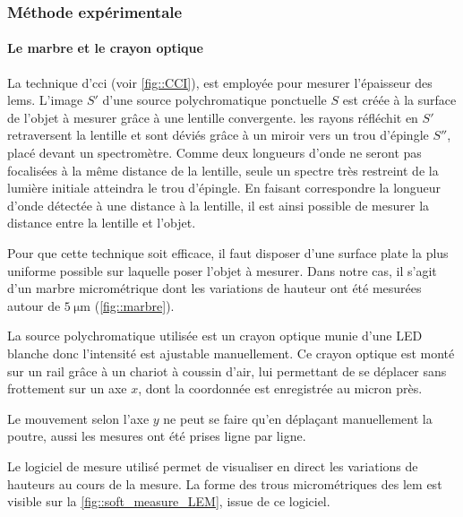             \subsubsection{Méthode expérimentale}
                \paragraph{Le marbre et le crayon optique}
                
                    La technique d'\gls{cci} (voir \autoref{fig::CCI}), est employée pour mesurer l'épaisseur des \glspl{lem}. L'image $S'$ d'une source polychromatique ponctuelle $S$ est créée à la surface de l'objet à mesurer grâce à une lentille convergente. les rayons réfléchit en $S'$ retraversent la lentille et sont déviés grâce à un miroir vers un trou d'épingle $S''$, placé devant un spectromètre. Comme deux longueurs d'onde ne seront pas focalisées à la même distance de la lentille, seule un spectre très restreint de la lumière initiale atteindra le trou d'épingle. En faisant correspondre la longueur d'onde détectée à une distance à la lentille, il est ainsi possible de mesurer la distance entre la lentille et l'objet.%
                    
                    Pour que cette technique soit efficace, il faut disposer d'une surface plate la plus uniforme possible sur laquelle poser l'objet à mesurer. Dans notre cas, il s'agit d'un marbre micrométrique dont les variations de hauteur ont été mesurées autour de $\SI{5}{\micro\meter}$ (\autoref{fig::marbre}).
                    
                    La source polychromatique utilisée est un crayon optique munie d'une LED blanche donc l'intensité est ajustable manuellement. Ce crayon optique est monté sur un rail grâce à un chariot à coussin d'air, lui permettant de se déplacer sans frottement sur un axe $x$, dont la coordonnée est enregistrée au micron près.
                    
                    Le mouvement selon l'axe $y$ ne peut se faire qu'en déplaçant manuellement la poutre, aussi les mesures ont été prises ligne par ligne.
                    
                    Le logiciel de mesure utilisé permet de visualiser en direct les variations de hauteurs au cours de la mesure. La forme des trous micrométriques des \gls{lem} est visible sur la \autoref{fig::soft_measure_LEM}, issue de ce logiciel. 
                    
